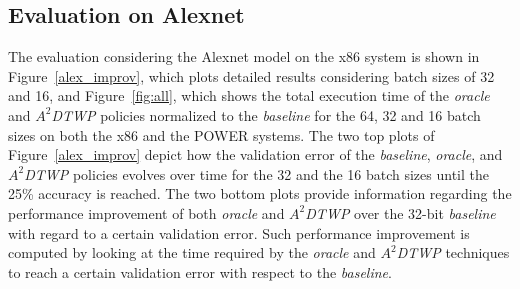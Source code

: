 \subsection{Evaluation on Alexnet}
\label{sec:alexnet}
The evaluation considering the Alexnet model on the x86 system is shown in  
Figure~\ref{alex_improv}, which plots detailed results considering batch sizes 
of 32 and 16, and Figure~\ref{fig:all}, which shows the total execution time of 
the \textit{oracle} and \textit{$A^2$DTWP} policies normalized to the 
\textit{baseline} for the 64, 32 and 16 batch sizes on both the x86 and the 
POWER systems.
The two top plots of Figure~\ref{alex_improv} depict how the validation error of 
the \textit{baseline}, \textit{oracle}, and \textit{$A^2$DTWP} policies evolves 
over time for the 32 and the 16 batch sizes until the 25\% accuracy is reached.
The two bottom plots provide information regarding the performance improvement 
of both \textit{oracle} and \textit{$A^2$DTWP} over the 32-bit \textit{baseline} 
with regard to a certain validation error.  Such performance improvement is 
computed by looking at the time required by the \textit{oracle} and 
\textit{$A^2$DTWP} techniques to reach a certain validation error with respect 
to the \textit{baseline}.

